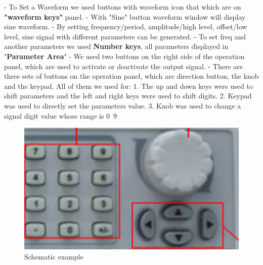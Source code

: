 - To Set a Waveform we used buttons with waveform icon that which are on \textbf{"waveform keys"} panel.
- With "Sine" button waveform window will display sine waveform.
- By setting frequency/period, amplitude/high level,
offset/low level, sine signal with different parameters can be generated.
- To set freq and another parameters we used \textbf{Number keys}, all parameters displayed in "\textbf{Parameter Area}"
- We used two buttons on the right side of the
   operation panel, which are used to activate or deactivate the output signal.
- There are three sets of buttons on the operation
  panel, which are direction button, the knob and the keypad.
  All of them we used for:
1. The up and down keys were used to shift parameters and the left and right
     keys were used to shift digits.
2. Keypad was used to directly set the parameters value.
3. Knob was used to change a signal digit value whose range is 0~9

\begin{figure}[H]
	\centering
	\includegraphics[width=12cm]{images/13.png}
	\caption{Schematic example}
	\label{fig:wow3}
\end{figure}

